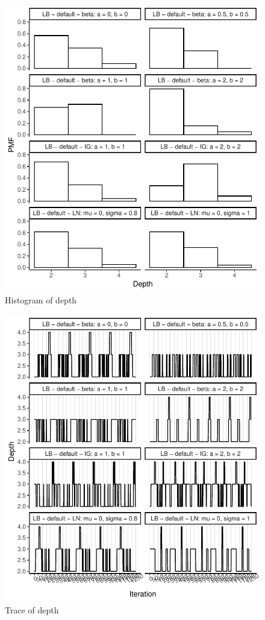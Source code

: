 \documentclass{amsart}
\begin{document}
%
\begin{figure}[ht]
	\centering
	\includegraphics[width=0.95\linewidth]{hist_depth_3.pdf}
	\caption{Histogram of depth}
	\label{fig:hist:depth:3}
\end{figure}

\begin{figure}[ht]
	\centering
	\includegraphics[width=0.95\linewidth]{trace_depth_3.pdf}
	\caption{Trace of depth}
	\label{fig:trace:depth:3}
\end{figure}
\end{document}
